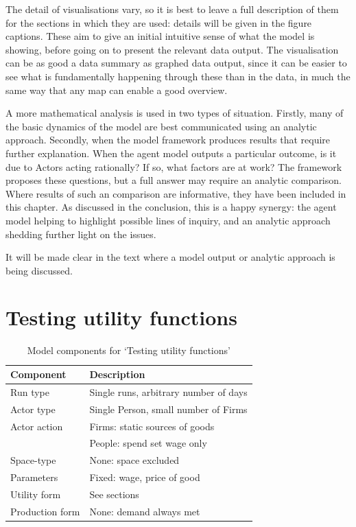The detail of visualisations vary, so it is best to leave a full description of them for the sections in which they are used: details will be given in the figure captions. These aim to give an initial intuitive sense of what the model is showing, before going on to present the relevant data output. The visualisation can be as good a data summary as graphed data output, since it can be easier to see what is fundamentally happening through these than in the data, in much the same way that any map can enable a good overview.

A more mathematical analysis is used in two types of situation. Firstly, many of the basic dynamics of the model are best communicated using an analytic approach. Secondly, when the model framework produces results that require further explanation. When the agent model outputs a particular outcome, is it due to Actors acting rationally? If so, what factors are at work? The framework proposes these questions, but a full answer may require an analytic comparison. Where results of such an comparison are informative, they have been  included in this chapter. As discussed in the conclusion, this is a happy synergy: the  agent model helping to highlight possible lines of inquiry, and an analytic approach  shedding further light on the issues.

It will be made clear in the text where a model output or analytic approach is being discussed.

\section{Testing utility functions \label{sec:testingutils}}

\renewcommand{\arraystretch}{1.2}
\begin{table}[!hbt]
\begin{center}

\begin{tabular}{|l|l|}
\hline 
\textbf{Component} & \textbf{Description}\\
\hline
Run type & Single runs, arbitrary number of days\\
\hline
Actor type & Single Person, small number of Firms\\
\hline
Actor action & Firms: static sources of goods \\
& People: spend set wage only\\
\hline
Space-type & None: space excluded \\
\hline
Parameters & Fixed: wage, price of good\\
\hline
Utility form & See sections\\
\hline
Production form & None: demand always met\\
\hline

\end{tabular}

\caption{Model components for `Testing utility functions' \label{tab:utiltests}}
\end{center}
\end{table}

